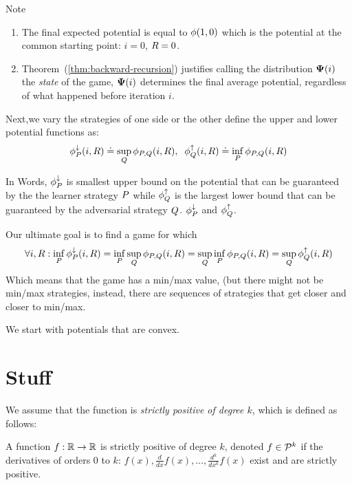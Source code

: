 \documentclass{article}[12pt]
\begin{document}
Note
\begin{enumerate}
\item
  The final expected potential is equal to $\phi(1,0)$ which is the
  potential at the common starting point: $i=0$, $R=0$.
\item
  Theorem~(\ref{thm:backward-recursion}) justifies calling the
  distribution ${\bf \Psi}(i)$ the {\em state} of the game, ${\bf \Psi}(i)$
  determines the final average potential, regardless of what happened
  before iteration $i$.

\end{enumerate}


Next,we vary the strategies of one side or the other define the upper and lower potential functions as:
\begin{equation}
  \phi_{P}^{\downarrow}(i,R) \doteq \sup_{Q} \phi_{P,Q}(i,R),\;\;
  \phi_{Q}^{\uparrow}(i,R) \doteq \inf_{P} \phi_{P,Q}(i,R)
\end{equation}

In Words, $\phi_{P}^{\downarrow}$ is smallest upper bound on the potential that can be
guaranteed by the the learner strategy $P$ while $\phi_{Q}^{\uparrow}$
is the largest lower bound that can be guaranteed by the adversarial
strategy $Q$. $\phi_{P}^{\downarrow}$ and $\phi_{Q}^{\uparrow}$.

Our ultimate goal is to find a game for which
\begin{equation} \label{eqn:infsup}
 \forall i, R: \inf_{P}\phi_{P}^{\downarrow}(i,R)
  = \inf_{P} \sup_{Q} \phi_{P,Q}(i,R) =
  \sup_{Q} \inf_{P} \phi_{P,Q}(i,R) =
  \sup_{Q} \phi_{Q}^{\uparrow}(i,R)
\end{equation}
Which means that the game has a min/max value, (but there might not be 
min/max strategies, instead, there are sequences of strategies that
get closer and closer to min/max.

We start with potentials that are convex.  

 
\section{Stuff}
We assume that the function is {\em strictly positive of degree $k$}, which is defined as follows:
\begin{definition}
A function $f:\mathbb{R} \to \mathbb{R}$ is strictly positive of degree $k$, 
denoted $f \in {\cal P}^{k}$ if the derivatives of orders 0 to $k$:  
$f(x), \frac{d}{dx}f(x), \ldots, \frac{d^k}{dx^k}f(x)$ exist and are strictly positive.
\end{definition}
\end{document}
